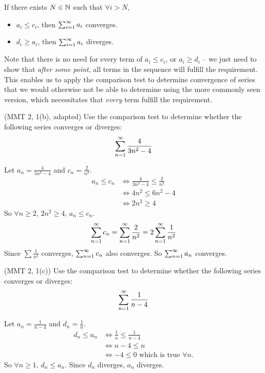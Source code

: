 \begin{test}
  If there exists $N \in \mathbb{N}$ such that $\forall i > N$,
  \begin{itemize}
    \item $a_i \leq c_i$, then $\sum_{i = 1} ^ \infty a_i$ converges.
    \item $d_i \geq a_i$, then $\sum_{i = 1} ^ \infty a_i$ diverges.
  \end{itemize}
\end{test}
Note that there is no need for every term of $a_i \leq c_i$, or $a_i \geq d_i$ -- we just need to show that \textit{after some point}, all terms in the sequence will fulfill the requirement. This enables us to apply the comparison test to determine convergence of series that we would otherwise not be able to determine using the more commonly seen version, which necessitates that \textit{every} term fulfill the requirement.
\begin{eg}
  (MMT 2, 1(b), adapted) Use the comparison test to determine whether the following series converges or diverges:
  \[
    \sum_{n = 1} ^ \infty \frac{4}{3n ^ 2 - 4}
  \]
\end{eg}
\begin{solution}
  Let $a_n = \frac{4}{5n ^ 2 - 4}$ and $c_n = \frac{2}{n ^ 2}$.
  \begin{align*}
    a_n \leq c_n &\iff \frac{4}{3n ^ 2 - 4} \leq \frac{2}{n ^ 2} \\
    &\iff 4n ^ 2 \leq 6n ^ 2 - 4 \\ 
    &\iff 2n ^ 2 \geq 4
  \end{align*}
  So $\forall n \geq 2$, $2n ^ 2 \geq 4$, $a_n \leq c_n$.
  \[
    \sum_{n = 1} ^ \infty c_n = \sum_{n = 1} ^ \infty \frac{2}{n ^ 2} = 2 \sum_{n = 1} ^ \infty \frac{1}{n ^ 2}
  \]
  Since $\sum \frac{1}{n ^ 2}$ converges, $\sum_{n = 1} ^ \infty c_n$ also converges. So $\sum_{n = 1} ^ \infty a_n$ converges.
\end{solution}
\begin{eg}
  (MMT 2, 1(c)) Use the comparison test to determine whether the following series converges or diverges:
  \[
    \sum_{n = 1} ^ \infty \frac{1}{n - 4}
  \]
\end{eg}
\begin{solution}
  Let $a_n = \frac{1}{n - 4}$ and $d_n = \frac{1}{n}$.
  \begin{align*}
    d_n \leq a_n &\iff \frac{1}{n} \leq \frac{1}{n - 4} \\ 
    &\iff n - 4 \leq n \\ 
    &\iff -4 \leq 0 \text{ which is true } \forall n.
  \end{align*}
  So $\forall n \geq 1$, $d_n \leq a_n$. Since $d_n$ diverges, $a_n$ diverges.
\end{solution}


